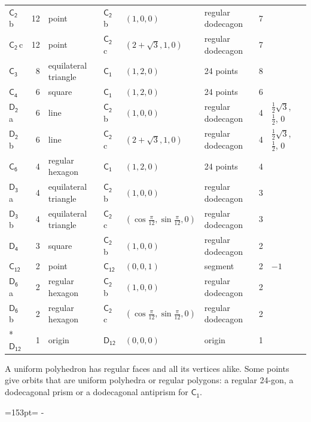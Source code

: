 \documentclass[10pt,a4paper]{article}
\newcommand{\needspace}[1]{\par\penalty-100\begingroup\dimen0=#1\relax\dimen2=\pagegoal
  \advance\dimen2-\pagetotal\ifdim\dimen0>\dimen2\relax\ifdim\dimen2>0pt\vfil\break\fi\fi
  \endgroup}
\numberwithin{equation}{section}
\newcommand{\grp}[1]{\mathsf{#1}}
\newcommand{\clsletter}[1]{\,{\scriptsize\color{black!55}#1}}
\newlength{\fillwidth}\newlength{\cellwidth}\newlength{\colwidth}
\begin{document}
{{\begin{longtable}{@{}lrllllr>{\RaggedRight\arraybackslash}p{\fillwidth}r@{}}
\href{C2.pdf}{$\grp{C_{2}}$}\clsletter{b} & 12 & point & \href{C2.pdf}{$\grp{C_{2}}$}\clsletter{b} & $(1, 0, 0)$ & regular dodecagon & 7 &  & \\
\href{C2.pdf}{$\grp{C_{2}}$}\clsletter{c} & 12 & point & \href{C2.pdf}{$\grp{C_{2}}$}\clsletter{c} & $(2 + \sqrt{3}, 1, 0)$ & regular dodecagon & 7 &  & \\
\href{C3.pdf}{$\grp{C_{3}}$} & 8 & equilateral triangle & \href{C1.pdf}{$\grp{C_{1}}$} & $(1, 2, 0)$ & 24 points & 8 &  & \\
\href{C4.pdf}{$\grp{C_{4}}$} & 6 & square & \href{C1.pdf}{$\grp{C_{1}}$} & $(1, 2, 0)$ & 24 points & 6 &  & \\
\href{D2.pdf}{$\grp{D_{2}}$}\clsletter{a} & 6 & line & \href{C2.pdf}{$\grp{C_{2}}$}\clsletter{b} & $(1, 0, 0)$ & regular dodecagon & 4 & ${\tfrac{1}{2}\sqrt{3}}$, ${\tfrac{1}{2}}$, ${0}$ & \\
\href{D2.pdf}{$\grp{D_{2}}$}\clsletter{b} & 6 & line & \href{C2.pdf}{$\grp{C_{2}}$}\clsletter{c} & $(2 + \sqrt{3}, 1, 0)$ & regular dodecagon & 4 & ${\tfrac{1}{2}\sqrt{3}}$, ${\tfrac{1}{2}}$, ${0}$ & \\
\href{C6.pdf}{$\grp{C_{6}}$} & 4 & regular hexagon & \href{C1.pdf}{$\grp{C_{1}}$} & $(1, 2, 0)$ & 24 points & 4 &  & \\
\href{D3.pdf}{$\grp{D_{3}}$}\clsletter{a} & 4 & equilateral triangle & \href{C2.pdf}{$\grp{C_{2}}$}\clsletter{b} & $(1, 0, 0)$ & regular dodecagon & 3 &  & \\
\href{D3.pdf}{$\grp{D_{3}}$}\clsletter{b} & 4 & equilateral triangle & \href{C2.pdf}{$\grp{C_{2}}$}\clsletter{c} & $(\cos\tfrac{\pi}{12}, \sin\tfrac{\pi}{12}, 0)$ & regular dodecagon & 3 &  & \\
\href{D4.pdf}{$\grp{D_{4}}$} & 3 & square & \href{C2.pdf}{$\grp{C_{2}}$}\clsletter{b} & $(1, 0, 0)$ & regular dodecagon & 2 &  & \\
\href{C12.pdf}{$\grp{C_{12}}$} & 2 & point & \href{C12.pdf}{$\grp{C_{12}}$} & $(0, 0, 1)$ & segment & 2 & ${-1}$ & \\
\href{D6.pdf}{$\grp{D_{6}}$}\clsletter{a} & 2 & regular hexagon & \href{C2.pdf}{$\grp{C_{2}}$}\clsletter{b} & $(1, 0, 0)$ & regular dodecagon & 2 &  & \\
\href{D6.pdf}{$\grp{D_{6}}$}\clsletter{b} & 2 & regular hexagon & \href{C2.pdf}{$\grp{C_{2}}$}\clsletter{c} & $(\cos\tfrac{\pi}{12}, \sin\tfrac{\pi}{12}, 0)$ & regular dodecagon & 2 &  & \\*
\href{D12.pdf}{$\grp{D_{12}}$} & 1 & origin & \href{D12.pdf}{$\grp{D_{12}}$} & $(0, 0, 0)$ & origin & 1 &  & \\
\bottomrule\end{longtable}}}
A uniform polyhedron has regular faces and all its vertices alike. Some points give orbits that are uniform polyhedra or regular polygons: a regular 24-gon, a dodecagonal prism or a dodecagonal antiprism for \href{C1.pdf}{$\grp{C_{1}}$}.
\needspace{153pt}
\end{document}
